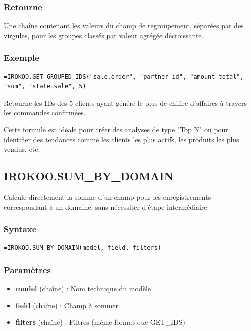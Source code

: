 \documentclass[12pt, a4paper]{article}
\begin{document}
\subsubsection{Retourne}
Une chaîne contenant les valeurs du champ de regroupement, séparées par des virgules, pour les groupes classés par valeur agrégée décroissante.

\subsubsection{Exemple}
\begin{lstlisting}
=IROKOO.GET_GROUPED_IDS("sale.order", "partner_id", "amount_total", "sum", "state=sale", 5)
\end{lstlisting}
Retourne les IDs des 5 clients ayant généré le plus de chiffre d'affaires à travers les commandes confirmées.

\begin{tip}
Cette formule est idéale pour créer des analyses de type "Top N" ou pour identifier des tendances comme les clients les plus actifs, les produits les plus vendus, etc.
\end{tip}

\subsection{IROKOO.SUM\_BY\_DOMAIN}
\begin{tcolorbox}[title=Description]
Calcule directement la somme d'un champ pour les enregistrements correspondant à un domaine, sans nécessiter d'étape intermédiaire.
\end{tcolorbox}

\subsubsection{Syntaxe}
\begin{lstlisting}
=IROKOO.SUM_BY_DOMAIN(model, field, filters)
\end{lstlisting}

\subsubsection{Paramètres}
\begin{itemize}
    \item \textbf{model} (chaîne) : Nom technique du modèle
    \item \textbf{field} (chaîne) : Champ à sommer
    \item \textbf{filters} (chaîne) : Filtres (même format que GET\_IDS)
\end{itemize}
\end{document}
